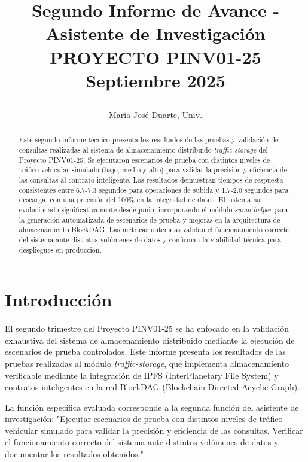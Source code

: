 \documentclass[onecolumn]{article}
\title{\vspace{-1.5cm}
\begin{center}
\LARGE
\textbf{Segundo Informe de Avance - Asistente de Investigación\\ 
PROYECTO PINV01-25} \\
\Large Septiembre 2025
\vspace{0.5cm}
\end{center}
}
\author[1]{María José Duarte, Univ.\orcidlink{0009-0002-2820-6791}}
\affil[1]{
\small
majodkw@gmail.com Laboratorio de Sistemas Distribuidos (LSD), Facultad de Ingeniería de la UNA (FIUNA), San Lorenzo, Paraguay.
}
\date{}
\begin{document}
\thispagestyle{firstpagestyle}
\maketitle

\vspace{-0.5cm}    
\begin{abstract}
Este segundo informe técnico presenta los resultados de las pruebas y validación de consultas realizadas al sistema de almacenamiento distribuido \textit{traffic-storage} del Proyecto PINV01-25. Se ejecutaron escenarios de prueba con distintos niveles de tráfico vehicular simulado (bajo, medio y alto) para validar la precisión y eficiencia de las consultas al contrato inteligente. Los resultados demuestran tiempos de respuesta consistentes entre 6.7-7.3 segundos para operaciones de subida y 1.7-2.0 segundos para descarga, con una precisión del 100\% en la integridad de datos. El sistema ha evolucionado significativamente desde junio, incorporando el módulo \textit{sumo-helper} para la generación automatizada de escenarios de prueba y mejoras en la arquitectura de almacenamiento BlockDAG. Las métricas obtenidas validan el funcionamiento correcto del sistema ante distintos volúmenes de datos y confirman la viabilidad técnica para despliegues en producción.
\vspace{0.5cm}
\end{abstract}

\section{Introducción}

El segundo trimestre del Proyecto PINV01-25 se ha enfocado en la validación exhaustiva del sistema de almacenamiento distribuido mediante la ejecución de escenarios de prueba controlados. Este informe presenta los resultados de las pruebas realizadas al módulo \textit{traffic-storage}, que implementa almacenamiento verificable mediante la integración de IPFS (InterPlanetary File System) y contratos inteligentes en la red BlockDAG (Blockchain Directed Acyclic Graph).

La función específica evaluada corresponde a la segunda función del asistente de investigación: "Ejecutar escenarios de prueba con distintos niveles de tráfico vehicular simulado para validar la precisión y eficiencia de las consultas. Verificar el funcionamiento correcto del sistema ante distintos volúmenes de datos y documentar los resultados obtenidos."
\end{document}
